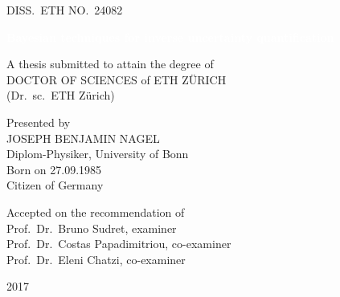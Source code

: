 \begin{titlepage}

\begin{center}

\thispagestyle{allempty}

{\large DISS.\ ETH NO.\ 24082 \par}

\vfill


\colorbox{ETH1}{%
\begin{minipage}[c]{\textwidth-2\fboxsep}
  \centering
  \begin{Huge}
    \vspace{1.5ex}
    \textcolor{white}{\textbf{Bayesian techniques for inverse uncertainty quantification}}
    \vspace{1.5ex} \par
  \end{Huge}
\end{minipage}%
}

\vfill

\begin{large}
A thesis submitted to attain the degree of \\[1ex]
DOCTOR OF SCIENCES of ETH ZÜRICH \\[1ex]
(Dr.\ sc.\ ETH Zürich) \par
\end{large}

\vfill

\begin{large}
Presented by \\[1ex]
JOSEPH BENJAMIN NAGEL \\[1ex]
Diplom-Physiker, University of Bonn \\[1ex]
Born on 27.09.1985 \\[1ex]
Citizen of Germany \par
\end{large}

\vfill

\begin{large}
Accepted on the recommendation of \\[1ex]
Prof.\ Dr.\ Bruno Sudret, examiner \\[1ex]
Prof.\ Dr.\ Costas Papadimitriou, co-examiner \\[1ex]
Prof.\ Dr.\ Eleni Chatzi, co-examiner \par
\end{large}

\vfill

{\large 2017 \par}

\end{center}

\end{titlepage}
